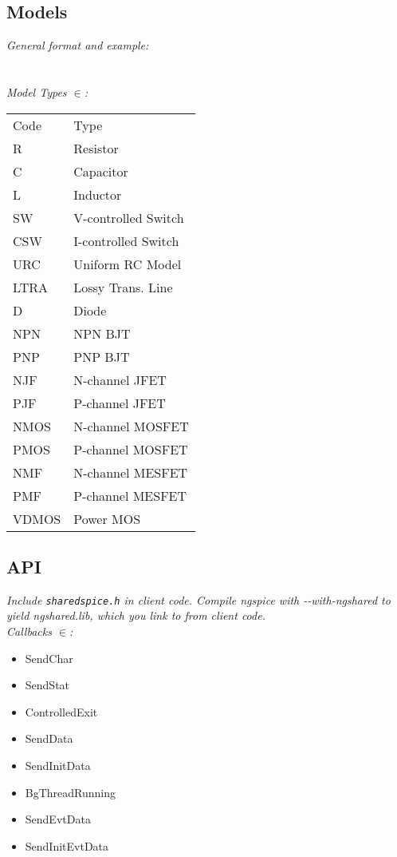 \subsection*{Models}

\textit{General format and example:}\\
  \\
  \\

\textit{Model Types $\in$: }\\
\begin{tabular}{l l}
Code & Type \\
R & Resistor\\
C & Capacitor \\
L & Inductor \\
SW & V-controlled Switch\\
CSW & I-controlled Switch \\
URC & Uniform RC Model \\
LTRA & Lossy Trans. Line\\
D & Diode \\
NPN & NPN BJT \\
PNP & PNP BJT \\
NJF & N-channel JFET\\
PJF & P-channel JFET \\
NMOS & N-channel MOSFET\\
PMOS & P-channel MOSFET\\
NMF & N-channel MESFET\\
PMF & P-channel MESFET\\
VDMOS & Power MOS\\
\end{tabular}



\subsection*{API}
\textit{Include \texttt{sharedspice.h} in client code. Compile ngspice with -{}-with-ngshared to yield ngshared.lib, which you link to from client code.}\\

\textit{Callbacks $\in$:}
\begin{multicols}{2}
{\footnotesize 
\begin{itemize}[label={}]
    \item SendChar 
    \item SendStat
    \item ControlledExit
    \item SendData
    \item SendInitData
    \item BgThreadRunning
    \item SendEvtData
    \item SendInitEvtData
\end{itemize}
}
\end{multicols}

